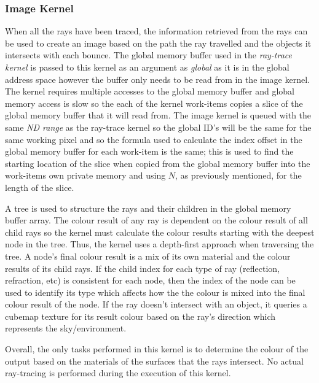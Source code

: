 \documentclass[final]{cmpreport}
\begin{document}
\subsubsection{Image Kernel}

When all the rays have been traced, the information retrieved from the rays can be used to create an image based on the path the ray travelled and the objects it intersects with each bounce. The global memory buffer used in the \textit{ray-trace kernel} is passed to this kernel as an argument as \textit{global} as it is in the global address space however the buffer only needs to be read from in the image kernel. The kernel requires multiple accesses to the global memory buffer and global memory access is slow so the each of the kernel work-items copies a slice of the global memory buffer that it will read from. The image kernel is queued with the same \textit{ND range} as the ray-trace kernel so the global ID's will be the same for the same working pixel and so the formula used to calculate the index offset in the global memory buffer for each work-item is the same; this is used to find the starting location of the slice when copied from the global memory buffer into the work-items own private memory and using $N$, as previously mentioned, for the length of the slice.

A tree is used to structure the rays and their children in the global memory buffer array. The colour result of any ray is dependent on the colour result of all child rays so the kernel must calculate the colour results starting with the deepest node in the tree. Thus, the kernel uses a depth-first approach when traversing the tree. A node's final colour result is a mix of its own material and the colour results of its child rays. If the child index for each type of ray (reflection, refraction, etc) is consistent for each node, then the index of the node can be used to identify its type which affects how the the colour is mixed into the final colour result of the node. If the ray doesn't intersect with an object, it queries a cubemap texture for its result colour based on the ray's direction which represents the sky/environment.

Overall, the only tasks performed in this kernel is to determine the colour of the output based on the materials of the surfaces that the rays intersect. No actual ray-tracing is performed during the execution of this kernel.
\end{document}
